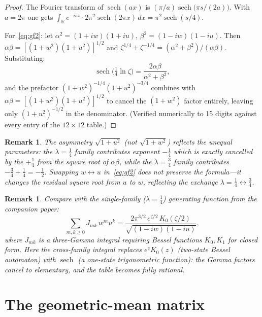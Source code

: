 \documentclass[11pt,a4paper]{article}
\newtheorem{remark}[theorem]{Remark}
\newcommand{\R}{\mathbb{R}}
\begin{document}
\begin{proof}
The Fourier transform of $\operatorname{sech}(ax)$ is
$(\pi/a)\operatorname{sech}\bigl(\pi s/(2a)\bigr)$.
With $a = 2\pi$ one gets
$\int_\R e^{-isx}\cdot
2\pi^2\operatorname{sech}(2\pi x)\,dx
= \pi^2\operatorname{sech}(s/4)$.

For~\eqref{eq:gf2}: let
$\alpha^2 = (1{+}iw)(1{+}iu)$,
$\beta^2 = (1{-}iw)(1{-}iu)$.
Then $\alpha\beta = [(1{+}w^2)(1{+}u^2)]^{1/2}$ and
$\zeta^{1/4} + \zeta^{-1/4}
= (\alpha^2{+}\beta^2)/(\alpha\beta)$. Substituting:
\[
  \operatorname{sech}\bigl(\tfrac14\ln\zeta\bigr)
  = \frac{2\alpha\beta}{\alpha^2+\beta^2},
\]
and the prefactor $(1{+}w^2)^{-1/4}(1{+}u^2)^{-3/4}$ combines
with $\alpha\beta = [(1{+}w^2)(1{+}u^2)]^{1/2}$ to cancel the
$(1{+}w^2)$ factor entirely, leaving only $(1{+}u^2)^{-1/2}$ in
the denominator. (Verified numerically to 15 digits against every
entry of the $12\times12$ table.)
\end{proof}

\begin{remark}
The asymmetry $\sqrt{1+u^2}$ (not $\sqrt{1+w^2}$) reflects the
unequal parameters: the $\lambda = \tfrac14$ family contributes
exponent $-\tfrac14$ which is exactly cancelled by the $+\tfrac14$
from the square root of $\alpha\beta$, while the $\lambda=\tfrac34$
family contributes $-\tfrac34 + \tfrac14 = -\tfrac12$. Swapping
$w \leftrightarrow u$ in~\eqref{eq:gf2} does \emph{not} preserve
the formula---it changes the residual square root from $u$ to $w$,
reflecting the exchange $\lambda = \tfrac14 \leftrightarrow
\tfrac34$.
\end{remark}

\begin{remark}
Compare with the single-family ($\lambda = \tfrac14$) generating
function from the companion paper:
\[
  \sum_{m,k\ge0} J_{mk}\, w^m u^k
  = \frac{2\pi^{3/2}\, e^{\zeta/2}\, K_0(\zeta/2)}
    {\sqrt{(1-iw)(1-iu)}},
\]
where $J_{mk}$ is a three-Gamma integral requiring Bessel functions
$K_0, K_1$ for closed form. Here the cross-family integral replaces
$e^{z}K_0(z)$ (two-state Bessel automaton) with
$\operatorname{sech}$ (a one-state trigonometric function): the
Gamma factors cancel to elementary, and the table becomes fully
rational.
\end{remark}

\section{The geometric-mean matrix}
\end{document}
